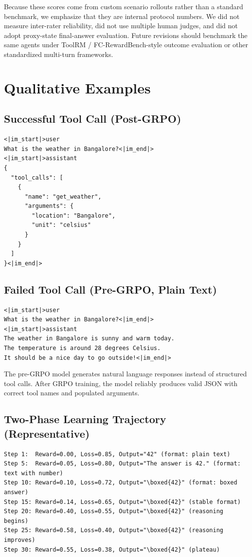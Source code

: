 \documentclass{article}
\begin{document}
Because these scores come from custom scenario rollouts rather than a standard benchmark, we emphasize that they are internal protocol numbers. We did not measure inter-rater reliability, did not use multiple human judges, and did not adopt proxy-state final-answer evaluation. Future revisions should benchmark the same agents under ToolRM / FC-RewardBench-style outcome evaluation or other standardized multi-turn frameworks.

\section{Qualitative Examples}

\subsection{Successful Tool Call (Post-GRPO)}
\begin{verbatim}
<|im_start|>user
What is the weather in Bangalore?<|im_end|>
<|im_start|>assistant
{
  "tool_calls": [
    {
      "name": "get_weather",
      "arguments": {
        "location": "Bangalore",
        "unit": "celsius"
      }
    }
  ]
}<|im_end|>
\end{verbatim}

\subsection{Failed Tool Call (Pre-GRPO, Plain Text)}
\begin{verbatim}
<|im_start|>user
What is the weather in Bangalore?<|im_end|>
<|im_start|>assistant
The weather in Bangalore is sunny and warm today.
The temperature is around 28 degrees Celsius.
It should be a nice day to go outside!<|im_end|>
\end{verbatim}

The pre-GRPO model generates natural language responses instead of structured tool calls. After GRPO training, the model reliably produces valid JSON with correct tool names and populated arguments.

\subsection{Two-Phase Learning Trajectory (Representative)}

\begin{verbatim}
Step 1:  Reward=0.00, Loss=0.85, Output="42" (format: plain text)
Step 5:  Reward=0.05, Loss=0.80, Output="The answer is 42." (format: text with number)
Step 10: Reward=0.10, Loss=0.72, Output="\boxed{42}" (format: boxed answer)
Step 15: Reward=0.14, Loss=0.65, Output="\boxed{42}" (stable format)
Step 20: Reward=0.40, Loss=0.55, Output="\boxed{42}" (reasoning begins)
Step 25: Reward=0.58, Loss=0.40, Output="\boxed{42}" (reasoning improves)
Step 30: Reward=0.55, Loss=0.38, Output="\boxed{42}" (plateau)
\end{verbatim}
\end{document}
